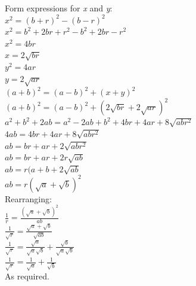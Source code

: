 \documentclass[../main.tex]{subfiles}
\begin{document}
\begin{enumerate}
    Form expressions for \textit{x} and \textit{y}:\\
    \(x^2=(b+r)^2-(b-r)^2\)\\
    \(x^2=b^2+2br+r^2-b^2+2br-r^2\)\\
    \(x^2=4br\)\\
    \(x=2\sqrt{br}\)\\
    \(y^2=4ar\)\\
    \(y=2\sqrt{ar}\)\\

    \((a+b)^2=(a-b)^2+(x+y)^2\)\\
    \((a+b)^2=(a-b)^2+(2\sqrt{br}+2\sqrt{ar})^2\)\\
    \(a^2+b^2+2ab=a^2-2ab+b^2+4br+4ar+8\sqrt{abr^2}\)\\
    \(4ab=4br+4ar+8\sqrt{abr^2}\)\\
    \(ab=br+ar+2\sqrt{abr^2}\)\\
    \(ab=br+ar+2r\sqrt{ab}\)\\
    \(ab=r(a+b+2\sqrt{ab}\)\\
    \(ab=r(\sqrt{a}+\sqrt{b})^2\)\\

    Rearranging:\\
    \(\frac{1}{r}=\frac{(\sqrt{a}+\sqrt{b})^2}{ab}\)\\
    \(\frac{1}{\sqrt{r}}=\frac{\sqrt{a}+\sqrt{b}}{\sqrt{ab}}\)\\
    \(\frac{1}{\sqrt{r}}=\frac{\sqrt{a}}{\sqrt{a}\sqrt{b}}+\frac{\sqrt{b}}{\sqrt{a}\sqrt{b}}\)\\
    \(\frac{1}{\sqrt{r}}=\frac{1}{\sqrt{a}}+\frac{1}{\sqrt{b}}\)\\
    As required. 
    
\end{enumerate}
\end{document}
